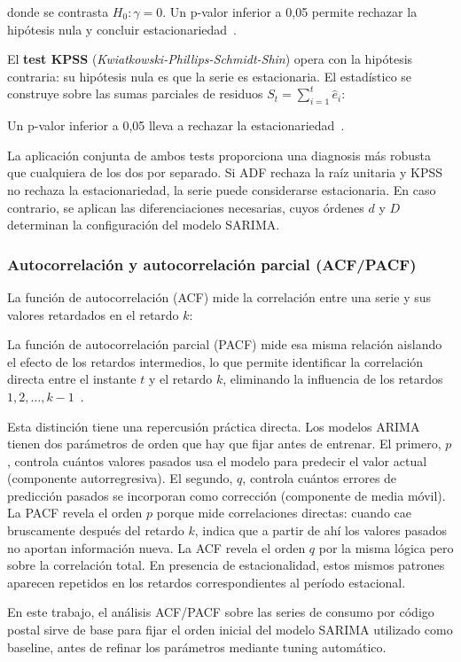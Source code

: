 \documentclass[12pt, a4paper]{article}
\begin{document}
donde se contrasta $H_0: \gamma = 0$. Un p-valor inferior a 0,05 permite rechazar la hipótesis nula y concluir estacionariedad~\cite{hyndman2021}.

El \textbf{test KPSS} (\textit{Kwiatkowski-Phillips-Schmidt-Shin}) opera con la hipótesis contraria: su hipótesis nula es que la serie es estacionaria. El estadístico se construye sobre las sumas parciales de residuos $S_t = \sum_{i=1}^{t} \hat{e}_i$:

Un p-valor inferior a 0,05 lleva a rechazar la estacionariedad~\cite{hyndman2021}.

La aplicación conjunta de ambos tests proporciona una diagnosis más robusta que cualquiera de los dos por separado. Si ADF rechaza la raíz unitaria y KPSS no rechaza la estacionariedad, la serie puede considerarse estacionaria. En caso contrario, se aplican las diferenciaciones necesarias, cuyos órdenes $d$ y $D$ determinan la configuración del modelo SARIMA.

\subsubsection{Autocorrelación y autocorrelación parcial (ACF/PACF)}


La función de autocorrelación (ACF) mide la correlación entre una serie y sus valores retardados en el retardo $k$:

La función de autocorrelación parcial (PACF) mide esa misma relación aislando el efecto de los retardos intermedios, lo que permite identificar la correlación directa entre el instante $t$ y el retardo $k$, eliminando la influencia de los retardos $1, 2, \dots , k-1$~\cite{hyndman2021}.

Esta distinción tiene una repercusión práctica directa. Los modelos ARIMA tienen dos parámetros de orden que hay que fijar antes de entrenar. El primero, $p$, controla cuántos valores pasados usa el modelo para predecir el valor actual (componente autorregresiva). El segundo, $q$, controla cuántos errores de predicción pasados se incorporan como corrección (componente de media móvil). La PACF revela el orden $p$ porque mide correlaciones directas: cuando cae bruscamente después del retardo $k$, indica que a partir de ahí los valores pasados no aportan información nueva. La ACF revela el orden $q$ por la misma lógica pero sobre la correlación total. En presencia de estacionalidad, estos mismos patrones aparecen repetidos en los retardos correspondientes al período estacional.

En este trabajo, el análisis ACF/PACF sobre las series de consumo por código postal sirve de base para fijar el orden inicial del modelo SARIMA utilizado como baseline, antes de refinar los parámetros mediante tuning automático.
\end{document}
